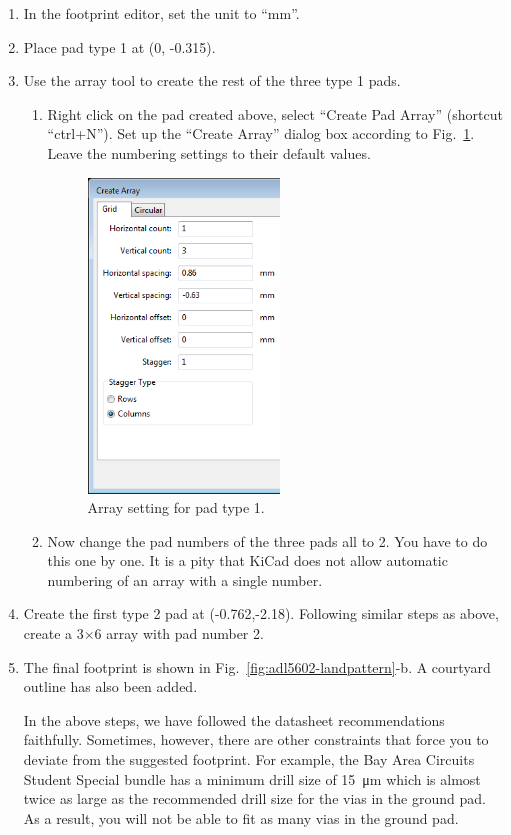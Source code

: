 \documentclass[12pt,letterpaper]{scrartcl}
\begin{document}
\begin{enumerate}
	\item In the footprint editor, set the unit to ``mm''.
	\item Place pad type 1 at (0, -0.315). 
	\item Use the array tool to create the rest of the three type 1 pads. 	
		\begin{enumerate}
			\item Right click on the pad created above, select ``Create Pad Array'' (shortcut ``ctrl+N''). Set up the ``Create Array'' dialog box according to Fig.~\ref{fig:pad-array-1}. Leave the numbering settings to their default values.
			
			\begin{figure}[hp]
				\centering
				\includegraphics[width=2in]{pad-array-1}
				\caption{Array setting for pad type 1.}
				\label{fig:pad-array-1}
			\end{figure}
			
			\item Now change the pad numbers of the three pads all to 2. You have to do this one by one. It is a pity that KiCad does not allow automatic numbering of an array with a single number. 
			 
		\end{enumerate}
	\item Create the first type 2 pad at (-0.762,-2.18). Following similar steps as above, create a 3$\times$6 array with pad number 2.
	
	\item The final footprint is shown in Fig.~\ref{fig:adl5602-landpattern}-b. A courtyard outline has also been added. 

In the above steps, we have followed the datasheet recommendations faithfully. Sometimes, however, there are other constraints that force you to deviate from the suggested footprint. For example, the Bay Area Circuits Student Special bundle has a minimum drill size of \SI{15}{\micro\meter} which is almost twice as large as the recommended drill size for the vias in the ground pad. As a result, you will not be able to fit as many vias in the ground pad. 

\end{enumerate}
\end{document}
